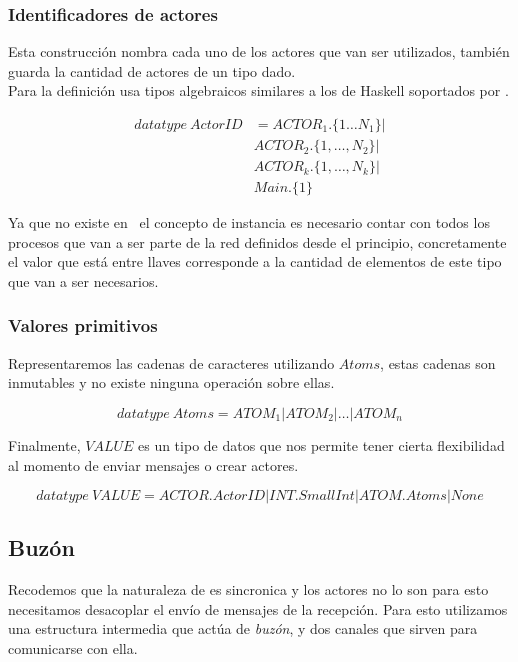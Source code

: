 \subsubsection{Identificadores de actores}

Esta construcción nombra cada uno de los actores que van ser utilizados, también
guarda la cantidad de actores de un tipo dado. \\
Para la definición usa tipos algebraicos similares a los de Haskell soportados por \CSPm.

\begin{figure}[H]
\begin{align*}
  datatype\ ActorID &= ACTOR_1.\{1 \ldots N_1\} | \\
  & ACTOR_2.\{1, \ldots ,N_2\} | \\
  & ACTOR_k.\{1, \ldots, N_k\} | \\
  & Main.\{1\}
\end{align*}
\end{figure}

Ya que no existe en \CSP\ el concepto de instancia es necesario contar con todos los 
procesos que van a ser parte de la red definidos desde el principio, concretamente 
el valor que está entre llaves corresponde a la cantidad de elementos de este
tipo que van a ser necesarios. 

\subsubsection{Valores primitivos}

Representaremos las cadenas de caracteres utilizando $Atoms$, estas cadenas son inmutables y no existe ninguna operación sobre ellas.

\[
  datatype\ Atoms = ATOM_1 | ATOM_2 | \ldots | ATOM_n
\]

Finalmente, $VALUE$ es un tipo de datos que nos permite tener cierta flexibilidad al momento de enviar mensajes o crear actores.

\[
  datatype\ VALUE = ACTOR.ActorID | INT.SmallInt | ATOM.Atoms | None
\]

\subsection{Buzón}

Recodemos que la naturaleza de \CSP es sincronica y los actores no lo son para esto necesitamos desacoplar el envío de mensajes de la recepción. Para esto utilizamos una estructura intermedia que actúa de \textit{buzón}, y dos canales que sirven para comunicarse con ella.

